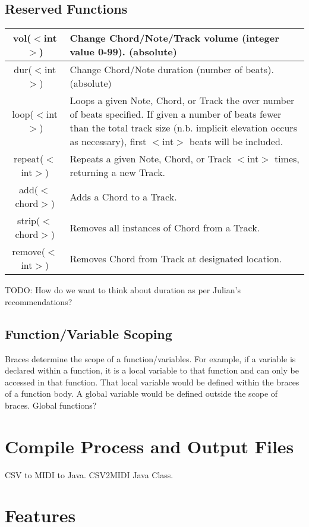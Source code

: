 \documentclass[letterpaper]{article}
\begin{document}
\subsection{Reserved Functions}
\begin{table}[H]
\centering
\begin{tabularx}{.75\textwidth}{|c|X|}
\hline
vol($<$int$>$) & Change Chord/Note/Track volume (integer value 0-99). (absolute) \\
\hline
dur($<$int$>$) & Change Chord/Note duration (number of beats). (absolute) \\
\hline
loop($<$int$>$) & Loops a given Note, Chord, or Track the over number of beats specified. If given a number of beats fewer than the total track size (n.b. implicit elevation occurs as necessary), first $<$int$>$ beats will be included. \\
\hline
repeat($<$int$>$) & Repeats a given Note, Chord, or Track $<$int$>$ times, returning a new Track. \\
\hline
add($<$chord$>$) & Adds a Chord to a Track. \\
\hline
strip($<$chord$>$) & Removes all instances of Chord from a Track. \\
\hline
remove($<$int$>$) & Removes Chord from Track at designated location. \\
\hline
\end{tabularx}
\end{table}
TODO: How do we want to think about duration as per Julian's recommendations?

\subsection{Function/Variable Scoping}
Braces determine the scope of a function/variables. For example, if a variable is declared within a function, it is a local variable to that function and can only be accessed in that function. That local variable would be defined within the braces of a function body. A global variable would be defined outside the scope of braces.
Global functions?

\section{Compile Process and Output Files}
CSV to MIDI to Java. CSV2MIDI Java Class. 

\section{Features}
\end{document}
